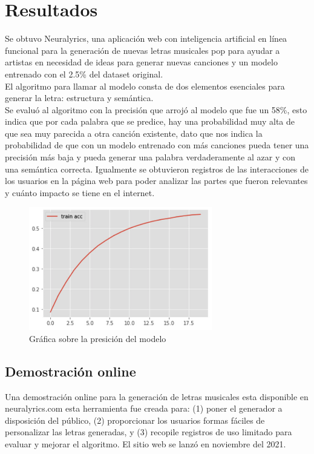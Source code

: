 \section{Resultados}
Se obtuvo Neuralyrics, una aplicación web con inteligencia artificial en línea funcional para la generación de nuevas letras musicales pop para ayudar a artistas en necesidad de ideas para generar nuevas canciones y un modelo entrenado con el 2.5\% del dataset original.\\
El algoritmo para llamar al modelo consta de dos elementos esenciales para generar la letra: estructura y semántica.\\
Se evaluó al algoritmo con la precisión que arrojó al modelo que fue un 58\%, esto indica que por cada palabra que se predice, hay una probabilidad muy alta de que sea muy parecida a otra canción existente, dato que nos indica la probabilidad de que con un modelo entrenado con más canciones pueda tener una precisión más baja y pueda generar una palabra verdaderamente al azar y con una semántica correcta. Igualmente se obtuvieron registros de las interacciones de los usuarios en la página web para poder analizar las partes que fueron relevantes y cuánto impacto se tiene en el internet.
\begin{figure}[h]
	\centering
	\includegraphics[width=8cm]{figuras/Graficapre.png}
	\caption{Gráfica sobre la presición del modelo}
	\label{fig:Gráfica sobre la presición del modelo}
\end{figure}
\subsection{Demostración online}
Una demostración online para la generación de letras musicales esta disponible en neuralyrics.com esta herramienta fue creada para:
(1) poner el generador a disposición del público, (2) proporcionar
los usuarios formas fáciles de personalizar las letras generadas, y
(3) recopile registros de uso limitado para evaluar y mejorar el algoritmo. El sitio web se lanzó en noviembre del
2021.